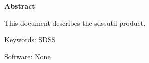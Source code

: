 %
%
%
\ifodd\userabstract
\vspace*{2ex}
\vspace{7ex}
{
   \small
   \begin{center}
      \bf Abstract
   \end{center}
   \begin{indpar}{0.625in}{0.625in}%
%
This document describes the sdssutil product.
%
   \end{indpar}
}
\fi					%
%
%
%
\vspace*{3ex}
\vfill
%
%
\def\usermisc	{0}
\ifodd\userkeywords\def\usermisc{1}\fi
\ifodd\usersoftware\def\usermisc{1}\fi
%
\ifodd\usermisc
\begin{list}{}{%
   \setlength{\itemindent}{0pt}
   \setlength{\labelwidth}{5em}
   \setlength{\leftmargin}{\labelwidth} \addtolength{\leftmargin}{\labelsep}
                                        \addtolength{\leftmargin}{\itemindent}
   }
%
   \ifodd\userkeywords
   \item [Keywords:\hfill] SDSS
   \fi
%
   \ifodd\usersoftware
   \item [Software:\hfill] None
   \fi
\end{list}
